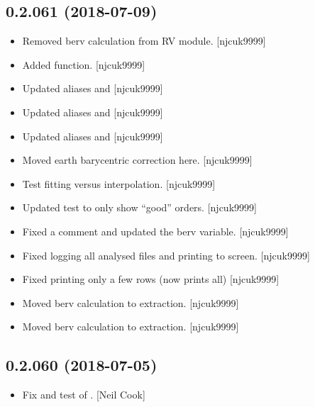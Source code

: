\documentclass[a4paper,10pt,english]{report}
\begin{document}
\subsection{0.2.061 (2018-07-09)}
\label{\detokenize{misc/changelog:id399}}\begin{itemize}
\item {} 
Removed berv calculation from RV module. {[}njcuk9999{]}

\item {} 
Added  function. {[}njcuk9999{]}

\item {} 
Updated aliases and  {[}njcuk9999{]}

\item {} 
Updated aliases and  {[}njcuk9999{]}

\item {} 
Updated aliases and  {[}njcuk9999{]}

\item {} 
Moved earth barycentric correction here. {[}njcuk9999{]}

\item {} 
Test fitting versus interpolation. {[}njcuk9999{]}

\item {} 
Updated test to only show “good” orders. {[}njcuk9999{]}

\item {} 
Fixed a comment and updated the berv variable. {[}njcuk9999{]}

\item {} 
Fixed logging all analysed files and printing to screen. {[}njcuk9999{]}

\item {} 
Fixed  printing only a few rows (now prints all)
{[}njcuk9999{]}

\item {} 
Moved berv calculation to extraction. {[}njcuk9999{]}

\item {} 
Moved berv calculation to extraction. {[}njcuk9999{]}

\end{itemize}


\subsection{0.2.060 (2018-07-05)}
\label{\detokenize{misc/changelog:id400}}\begin{itemize}
\item {} 
Fix and test of . {[}Neil Cook{]}

\end{itemize}
\end{document}
